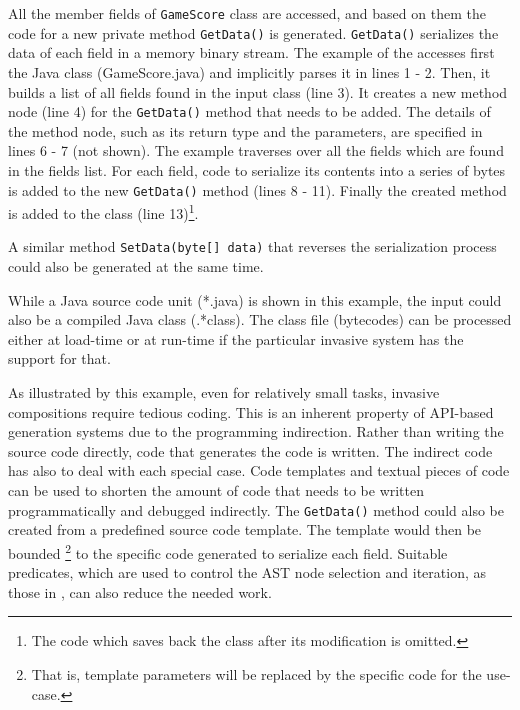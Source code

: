 \begin{dinglist}{43}
All the member fields of \texttt{Ga\-me\-Sco\-re} class are accessed, and based on them the code for a new private method \texttt{Get\-Da\-ta()} is generated. \texttt{Get\-Data()} serializes the data of each field in a memory binary stream. The example of the  accesses first the Java class (GameScore.java) and implicitly parses it in lines 1 - 2. Then, it builds a list of all fields found in the input class (line 3). It creates a new method node (line 4) for the \texttt{Get\-Da\-ta()} method that needs to be added. The details of the method node, such as its return type and the parameters, are specified in lines 6 - 7 (not shown). The example traverses over all the fields which are found in the fields list. For each field, code to serialize its contents into a series of bytes is added to the new \texttt{Get\-Data()} method (lines 8 - 11). Finally the created method is added to the class (line 13)\footnote{The code which saves back the class after its modification is omitted.}. 

A similar method \texttt{Set\-Da\-ta(by\-te[]\- data)} that reverses the serialization process could also be generated at the same time.

\end{dinglist}

While a Java source code unit (*.java) is shown in this example, the input could also be a compiled Java class (.*class). The class file (bytecodes) can be processed either at load-time or at run-time if the particular invasive system has the support for that.

As illustrated by this example, even for relatively small tasks, invasive compositions require tedious coding. This is an inherent property of API-based generation systems \cite{voelter.generation} due to the programming indirection. Rather than writing the source code directly, code that generates the code is written. The indirect code has also to deal with each special case.
%
Code templates and textual pieces of code can be used to shorten the amount of code that needs to be written programmatically and debugged indirectly. The \texttt{Get\-Da\-ta()} method could also be created from a predefined source code template. The template would then be bounded \cite{java.compost}\footnote{That is, template parameters will be replaced by the specific code for the use-case.} to the specific code generated to serialize each field. Suitable predicates, which are used to control the AST node selection and iteration, as those in \cite{trans.strategy.01}, can also reduce the needed work.


